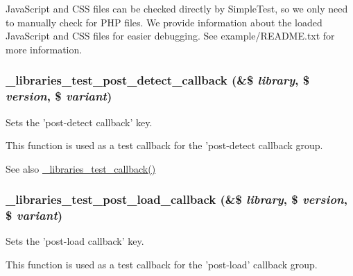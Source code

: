 JavaScript and CSS files can be checked directly by SimpleTest, so we only need to manually check for PHP files. We provide information about the loaded JavaScript and CSS files for easier debugging. See example/README.txt for more information. \hypertarget{libraries__test_8module_a3e5a93f087b4be8f9c29cbce815d86eb}{
\subsubsection[{\_\-libraries\_\-test\_\-post\_\-detect\_\-callback}]{\setlength{\rightskip}{0pt plus 5cm}\_\-libraries\_\-test\_\-post\_\-detect\_\-callback (\&\$ {\em library}, \/  \$ {\em version}, \/  \$ {\em variant})}}
\label{libraries__test_8module_a3e5a93f087b4be8f9c29cbce815d86eb}
Sets the 'post-\/detect callback' key.

This function is used as a test callback for the 'post-\/detect callback group.

\begin{DoxySeeAlso}{See also}
\hyperlink{libraries__test_8module_a4ecb0be495ba6a434403bc89961cbb8d}{\_\-libraries\_\-test\_\-callback()} 
\end{DoxySeeAlso}
\hypertarget{libraries__test_8module_a56d80a842e84c804712408cf7a1cbb19}{
\subsubsection[{\_\-libraries\_\-test\_\-post\_\-load\_\-callback}]{\setlength{\rightskip}{0pt plus 5cm}\_\-libraries\_\-test\_\-post\_\-load\_\-callback (\&\$ {\em library}, \/  \$ {\em version}, \/  \$ {\em variant})}}
\label{libraries__test_8module_a56d80a842e84c804712408cf7a1cbb19}
Sets the 'post-\/load callback' key.

This function is used as a test callback for the 'post-\/load' callback group.


